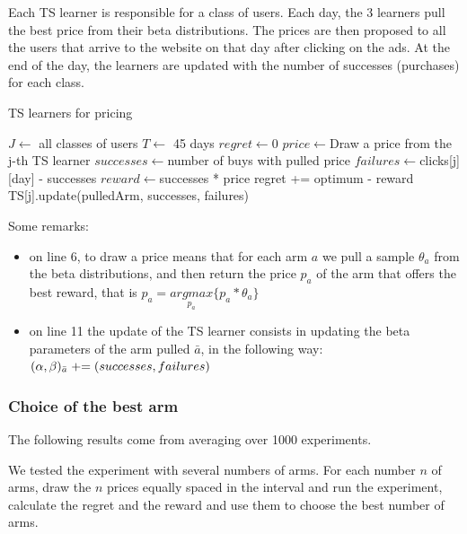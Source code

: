 Each TS learner is responsible for a class of users. Each day, the 3 learners pull the best price from their beta distributions. The prices are then proposed to all the users that arrive to the website on that day after clicking on the ads. At the end of the day, the learners are updated with the number of successes (purchases) for each class.

\begin{algorithm}
    \caption{TS learners for pricing}
    \label{alg:ts_pricing}
	\begin{algorithmic}[1]
        \STATE $J\gets ${ all classes of users}
        \STATE $T\gets ${ 45 days }
        \STATE $regret\gets ${0}
		\STATE $price\gets ${Draw a price from the j-th TS learner}
        \STATE $successes\gets ${number of buys with pulled price}
        \STATE $failures\gets ${clicks[j][day] - successes}
        \STATE $reward\gets ${successes * price}
        \STATE regret += optimum - reward
        \STATE TS[j].update(pulledArm, successes, failures)
        \ENDFOR
        \ENDFOR
	\end{algorithmic}
\end{algorithm}

Some remarks:
\begin{itemize}
    \item on line 6, to draw a price means that for each arm $a$ we pull a sample $\theta_a$ from the beta distributions, and then return the price $p_a$ of the arm that offers the best reward, that is $p_a = \underset{p_a}{argmax} \{p_a * \theta_a\}$
    \item on line 11 the update of the TS learner consists in updating the beta parameters of the arm pulled $\bar{a}$, in the following way: $(\alpha, \beta)_{\bar{a}} \mathrel{+}= (successes, failures)$
\end{itemize}

\subsubsection{Choice of the best arm}
The following results come from averaging over 1000 experiments.

We tested the experiment with several numbers of arms. For each number $n$ of arms, draw the $n$ prices equally spaced in the interval and run the experiment, calculate the regret and the reward and use them to choose the best number of arms.

